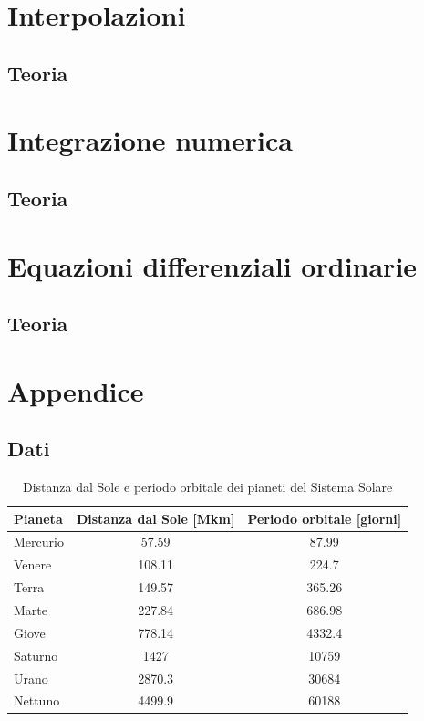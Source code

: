\documentclass[letterpaper, 12pt]{article}
\begin{document}
\section{Interpolazioni}
\subsection{Teoria}

\section{Integrazione numerica}
\subsection{Teoria}

\section{Equazioni differenziali ordinarie}
\subsection{Teoria}

\section{Appendice}
\subsection{Dati}

\begin{table}[!ht]
    \centering
    \caption{Distanza dal Sole e periodo orbitale dei pianeti del Sistema Solare}
    \label{tab:pianeti}
        \begin{tabular}{|l|c|c|}
        \hline
        \textbf{Pianeta} & \textbf{Distanza dal Sole [Mkm]} & \textbf{Periodo orbitale [giorni]} \\
        \hline
        Mercurio & 57.59   & 87.99   \\
        Venere   & 108.11  & 224.7   \\
        Terra    & 149.57  & 365.26  \\
        Marte    & 227.84  & 686.98  \\
        Giove    & 778.14  & 4332.4  \\
        Saturno  & 1427    & 10759   \\
        Urano    & 2870.3  & 30684   \\
        Nettuno  & 4499.9  & 60188   \\
        \hline
        \end{tabular}
\end{table}
\end{document}
